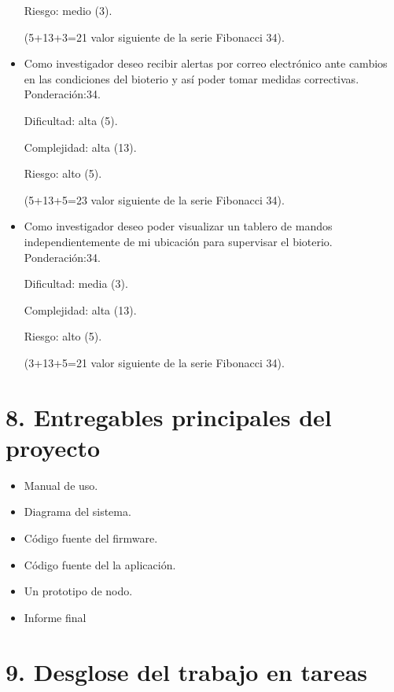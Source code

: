 \documentclass[
11pt, %
]{charter}
\begin{document}
\begin{itemize}
	Riesgo: medio (3).
	
	(5+13+3=21 valor siguiente de la serie Fibonacci 34).
	
	\item Como investigador deseo recibir alertas por correo electrónico ante cambios en las condiciones del bioterio y así poder tomar medidas correctivas.
	Ponderación:34.
	
	Dificultad: alta (5).
	
	Complejidad: alta (13).
	
	Riesgo: alto (5).
	
	(5+13+5=23 valor siguiente de la serie Fibonacci 34).
	
	\item Como investigador deseo poder visualizar un tablero de mandos independientemente de mi ubicación para supervisar el bioterio.
	Ponderación:34.
	
	Dificultad: media (3).
	
	Complejidad: alta (13).
	
	Riesgo: alto (5).
	
	(3+13+5=21 valor siguiente de la serie Fibonacci 34).
	
\end{itemize}

\section{8. Entregables principales del proyecto}
\label{sec:entregables}

\begin{itemize}
	\item Manual de uso.
	\item Diagrama del sistema.
	\item Código fuente del firmware.
	\item Código fuente del la aplicación.
	\item Un prototipo de nodo.
	\item Informe final
\end{itemize}

\section{9. Desglose del trabajo en tareas}
\label{sec:wbs}
\end{document}
